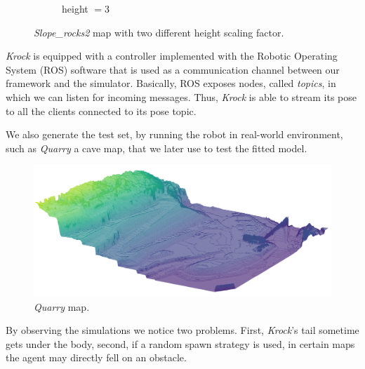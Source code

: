 \documentclass[../document.tex]{subfiles}
\begin{document}
\begin{figure} [htbp]
\begin{subfigure}[b]{0.5\textwidth}
			\caption{height $=3$}
	    \end{subfigure}	
	   
	\label{fig: heightmaps-heights}
	\caption{\emph{Slope\_rocks2} map with two different height scaling factor.}	
\end{figure}


\emph{Krock} is equipped with a controller implemented with the Robotic Operating System (ROS) software that is used as a communication channel between our framework and the simulator. Basically, ROS exposes nodes, called \emph{topics}, in which we can listen for incoming messages. Thus, \emph{Krock} is able to stream its pose to all the clients connected to its pose topic. 

We also generate the test set, by running the robot in real-world environment, such as \emph{Quarry} a cave map, that we later use to test the fitted model. 
\begin{figure} [htbp]
\centering
\includegraphics[width=\linewidth]{../img/querry-big-10.png}
\caption{\emph{Quarry} map.}
\label{req: quarry}
\end{figure}

By observing the simulations we notice two problems. First, \emph{Krock}'s tail sometime gets under the body, second, if a random spawn strategy is used, in certain maps the agent may directly fell on an obstacle.
\end{document}
